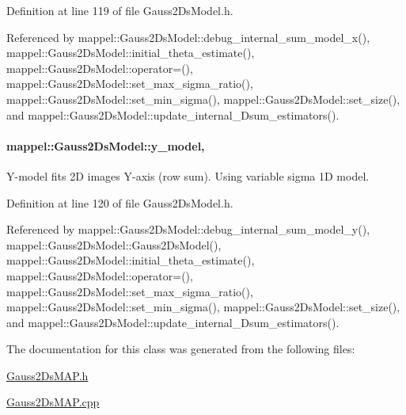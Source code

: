 Definition at line 119 of file Gauss2\+Ds\+Model.\+h.



Referenced by mappel\+::\+Gauss2\+Ds\+Model\+::debug\+\_\+internal\+\_\+sum\+\_\+model\+\_\+x(), mappel\+::\+Gauss2\+Ds\+Model\+::initial\+\_\+theta\+\_\+estimate(), mappel\+::\+Gauss2\+Ds\+Model\+::operator=(), mappel\+::\+Gauss2\+Ds\+Model\+::set\+\_\+max\+\_\+sigma\+\_\+ratio(), mappel\+::\+Gauss2\+Ds\+Model\+::set\+\_\+min\+\_\+sigma(), mappel\+::\+Gauss2\+Ds\+Model\+::set\+\_\+size(), and mappel\+::\+Gauss2\+Ds\+Model\+::update\+\_\+internal\+\_\+Dsum\+\_\+estimators().

\paragraph[{\texorpdfstring{y\+\_\+model}{y_model}}]{ mappel\+::\+Gauss2\+Ds\+Model\+::y\+\_\+model\hspace{0.3cm}{\ttfamily [protected]}, {\ttfamily [inherited]}}\hypertarget{classmappel_1_1Gauss2DsModel_a6efbb695d2f2285ac1a2f7cff7f67a07}{}\label{classmappel_1_1Gauss2DsModel_a6efbb695d2f2285ac1a2f7cff7f67a07}
Y-\/model fits 2D images Y-\/axis (row sum). Using variable sigma 1D model. 

Definition at line 120 of file Gauss2\+Ds\+Model.\+h.



Referenced by mappel\+::\+Gauss2\+Ds\+Model\+::debug\+\_\+internal\+\_\+sum\+\_\+model\+\_\+y(), mappel\+::\+Gauss2\+Ds\+Model\+::\+Gauss2\+Ds\+Model(), mappel\+::\+Gauss2\+Ds\+Model\+::initial\+\_\+theta\+\_\+estimate(), mappel\+::\+Gauss2\+Ds\+Model\+::operator=(), mappel\+::\+Gauss2\+Ds\+Model\+::set\+\_\+max\+\_\+sigma\+\_\+ratio(), mappel\+::\+Gauss2\+Ds\+Model\+::set\+\_\+min\+\_\+sigma(), mappel\+::\+Gauss2\+Ds\+Model\+::set\+\_\+size(), and mappel\+::\+Gauss2\+Ds\+Model\+::update\+\_\+internal\+\_\+Dsum\+\_\+estimators().



The documentation for this class was generated from the following files\+:\begin{DoxyCompactItemize}
\item 
\hyperlink{Gauss2DsMAP_8h}{Gauss2\+Ds\+M\+A\+P.\+h}\item 
\hyperlink{Gauss2DsMAP_8cpp}{Gauss2\+Ds\+M\+A\+P.\+cpp}\end{DoxyCompactItemize}
